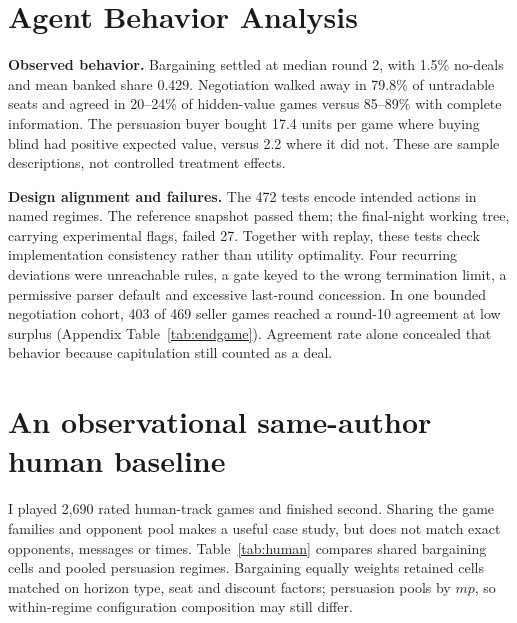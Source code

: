 \documentclass{article}
\begin{document}
\section{Agent Behavior Analysis}
\textbf{Observed behavior.} Bargaining settled at median round 2, with 1.5\%
no-deals and mean banked share 0.429. Negotiation walked away in 79.8\% of
untradable seats and agreed in 20--24\% of hidden-value games versus 85--89\%
with complete information. The persuasion buyer bought 17.4 units per game
where buying blind had positive expected value, versus 2.2 where it did not.
These are sample descriptions, not controlled treatment effects.

\textbf{Design alignment and failures.} The 472 tests encode intended actions
in named regimes. The reference snapshot passed them; the final-night working
tree, carrying experimental flags, failed 27. Together with replay, these tests
check implementation consistency rather than utility optimality. Four recurring
deviations were unreachable rules, a gate keyed to the wrong termination limit,
a permissive parser default and excessive last-round concession. In one bounded
negotiation cohort, 403 of 469 seller games reached a round-10 agreement at low
surplus (Appendix Table~\ref{tab:endgame}). Agreement rate alone concealed that
behavior because capitulation still counted as a deal.

\section{An observational same-author human baseline}
I played 2,690 rated human-track games and finished second. Sharing the game
families and opponent pool makes a useful case study, but does not match exact
opponents, messages or times. Table~\ref{tab:human} compares shared bargaining
cells and pooled persuasion regimes. Bargaining equally weights retained cells
matched on horizon type, seat and discount factors; persuasion pools by $mp$,
so within-regime configuration composition may still differ.
\end{document}
